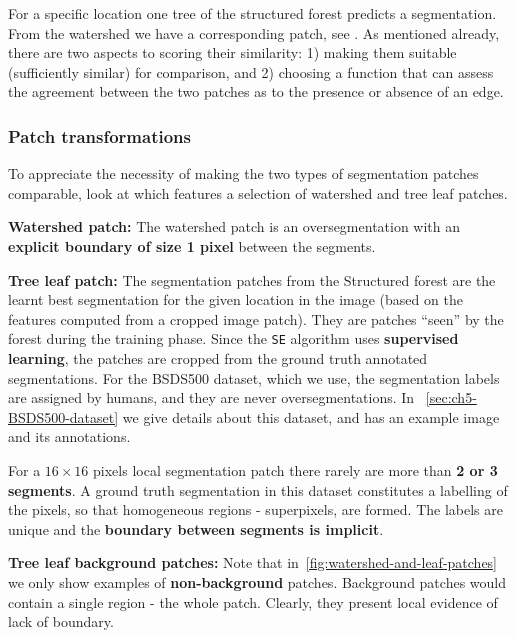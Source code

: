For a specific location one tree of the structured forest predicts a segmentation. From the watershed we have a corresponding patch, see . As mentioned already, there are two aspects to scoring their similarity: 1) making them suitable (\ie sufficiently similar) for comparison, and 2) choosing a function that can assess the agreement between the two patches as to the presence or absence of an edge.

\subsubsection{Patch transformations}
\label{sec:ch4-patch-transformations}
To appreciate the necessity of making the two types of segmentation patches comparable, look at  which features a selection of watershed and tree leaf patches.

\textbf{Watershed patch:} The watershed patch is an oversegmentation with an \textbf{explicit boundary of size 1 pixel} between the segments.

\textbf{Tree leaf patch:} The segmentation patches from the Structured forest are the learnt best segmentation for the given location in the image (based on the features computed from a cropped image patch). They are patches ``seen'' by the forest during the training phase. Since the {\tt SE} algorithm uses \textbf{supervised learning}, the patches are cropped from the ground truth annotated segmentations. 
For the BSDS500 dataset, which we use, the segmentation labels  are assigned by humans, and they are never oversegmentations. In \textsection~\ref{sec:ch5-BSDS500-dataset} we give details about this dataset, and  has an example image and its annotations.

For a $16\times 16$ pixels local segmentation patch there rarely are more than \textbf{2 or 3 segments}. 
A ground truth segmentation in this dataset constitutes a labelling of the pixels, so that homogeneous regions - superpixels, are formed. The labels are unique and the \textbf{boundary between segments is implicit}.

\textbf{Tree leaf background patches:} Note that in~\ref{fig:watershed-and-leaf-patches} we only show examples of \textbf{non-background} patches. Background patches would contain a single region - the whole patch. Clearly, %
they present local evidence of lack of boundary.

